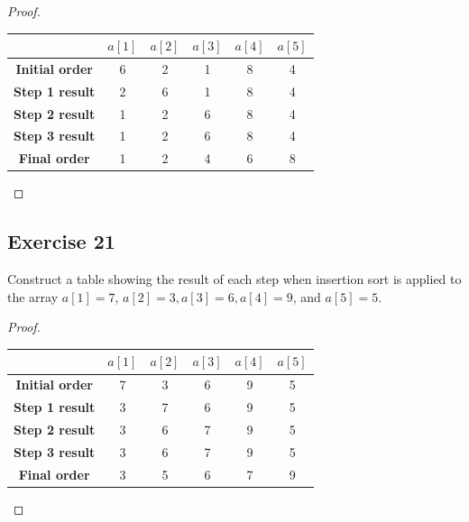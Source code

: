 \documentclass[14pt]{extarticle}
\begin{document}
\begin{proof}
    \begin{center}
        \begin{tabular}{|c|c|c|c|c|c|}
            \hline
                                & \(a[1]\) & \(a[2]\) & \(a[3]\) & \(a[4]\) & \(a[5]\) \\
            \hline
            {\bf Initial order} & 6        & 2        & 1        & 8        & 4        \\
            \hline
            {\bf Step 1 result} & 2        & 6        & 1        & 8        & 4        \\
            \hline
            {\bf Step 2 result} & 1        & 2        & 6        & 8        & 4        \\
            \hline
            {\bf Step 3 result} & 1        & 2        & 6        & 8        & 4        \\
            \hline
            {\bf Final order}   & 1        & 2        & 4        & 6        & 8        \\
            \hline
        \end{tabular}
    \end{center}
\end{proof}

\subsection{Exercise 21}
Construct a table showing the result of each step when insertion sort is applied to the array \(a[1] = 7\),
\(a[2] = 3, a[3] = 6, a[4] = 9\), and \(a[5] = 5\).

\begin{proof}
    \begin{center}
        \begin{tabular}{|c|c|c|c|c|c|}
            \hline
                                & \(a[1]\) & \(a[2]\) & \(a[3]\) & \(a[4]\) & \(a[5]\) \\
            \hline
            {\bf Initial order} & 7        & 3        & 6        & 9        & 5        \\
            \hline
            {\bf Step 1 result} & 3        & 7        & 6        & 9        & 5        \\
            \hline
            {\bf Step 2 result} & 3        & 6        & 7        & 9        & 5        \\
            \hline
            {\bf Step 3 result} & 3        & 6        & 7        & 9        & 5        \\
            \hline
            {\bf Final order}   & 3        & 5        & 6        & 7        & 9        \\
            \hline
        \end{tabular}
    \end{center}
\end{proof}
\end{document}
